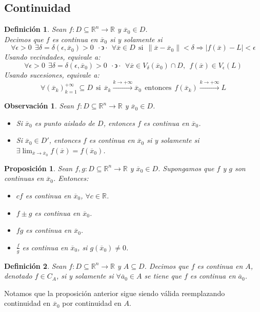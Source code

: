 \documentclass[11pt]{report}
\newtheorem{definition}{Definición}[section]
\newtheorem{observation}{Observación}[section]
\newtheorem{proposition}{Proposición}[section]
\newcommand{\Rn}{\mathbb{R}^{n}}
\newcommand{\R}{\mathbb{R}}
\newcommand{\azv}{\overline{a}_{0}}
\newcommand{\x}{\overline{x}}
\newcommand{\xz}{\overline{x}_{0}}
\newcommand{\tq}{\cdot\backepsilon\cdot}
\begin{document}
\subsection{Continuidad}

\begin{definition} Sean $f:D\subseteq\Rn\rightarrow\R$ y $\xz\in D$.\\
Decimos que $f$ es continua en $\xz$ si y solamente si
$$\forall\epsilon>0\ \ \exists\delta=\delta(\epsilon, \xz)>0\ \ \tq\ \ \forall\x\in D\ \ \text{si}\ \ \| \x-\xz \|<\delta\Rightarrow|f(\x)-L|<\epsilon$$
Usando vecindades, equivale a:
$$\forall\epsilon>0\ \ \exists\delta=\delta(\epsilon, \xz)>0\ \ \tq\ \ \forall\x\in V_{\delta}(\xz)\cap D,\ \ f(\x)\in V_{\epsilon}(L)$$
Usando sucesiones, equivale a:
$$\forall(\x_{k})_{k=1}^{+\infty}\subseteq D\ \ \text{si}\ \ \x_{k}\xrightarrow{k\rightarrow+\infty}\xz\ \ \text{entonces}\ \ f(\x_{k})\xrightarrow{k\rightarrow+\infty}L$$
\end{definition}

\begin{observation} Sean $f:D\subseteq\Rn\rightarrow\R$ y $\xz\in D$.
\begin{itemize}
\item[(i)] Si $\xz$ es punto aislado de $D$, entonces $f$ es continua en $\xz$.
\item[(ii)] Si $\xz\in D'$, entonces $f$ es continua en $\xz$ si y solamente si $\exists\lim_{\x\to\xz}f(\x)=f(\xz)$.
\end{itemize}
\end{observation}

\begin{proposition}
Sean $f, g:D\subseteq\Rn\rightarrow\R$ y $\xz\in D$. Supongamos que $f$ y $g$ son continuas en $\xz$. Entonces:
\begin{itemize}
\item[(i)] $cf$ es continua en $\xz$, $\forall c\in\R$.
\item[(ii)] $f\pm g$ es continua en $\xz$.
\item[(iii)] $fg$ es continua en $\xz$.
\item[(iv)] $\frac{f}{g}$ es continua en $\xz$, si $g(\xz)\ne0$.
\end{itemize}
\end{proposition}

\begin{definition} Sean $f:D\subseteq\Rn\rightarrow\R$ y $A\subseteq D$. Decimos que $f$ es continua en $A$, denotado $f\in C_{A}$, si y solamente si $\forall\azv\in A$ se tiene que $f$ es continua en $\azv$.
\end{definition}
Notamos que la proposición anterior sigue siendo válida reemplazando continuidad en $\xz$ por continuidad en $A$.
\end{document}
